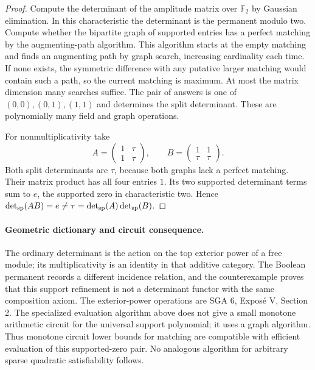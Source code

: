 \begin{proof}
Compute the determinant of the amplitude matrix over $\mathbb F_2$
by Gaussian elimination. In this characteristic the determinant
is the permanent modulo two. Compute whether the bipartite graph
of supported entries has a perfect matching by the augmenting-path
algorithm. This algorithm starts at the empty matching and finds
an augmenting path by graph search, increasing cardinality each
time. If none exists, the symmetric difference with any putative
larger matching would contain such a path, so the current matching
is maximum. At most the matrix dimension many searches suffice.
The pair of answers is one of $(0,0),(0,1),(1,1)$ and determines
the split determinant. These are polynomially many field and
graph operations.

For nonmultiplicativity take
\[
 A=\begin{pmatrix}1&\tau\\1&\tau\end{pmatrix},\qquad
 B=\begin{pmatrix}1&1\\\tau&\tau\end{pmatrix}.
\]
Both split determinants are $\tau$, because both graphs lack a
perfect matching. Their matrix product has all four entries $1$.
Its two supported determinant terms sum to $e$, the supported
zero in characteristic two. Hence
$\det_{\rm sp}(AB)=e\ne\tau=
\det_{\rm sp}(A)\det_{\rm sp}(B)$.
\end{proof}

\paragraph{Geometric dictionary and circuit consequence.}
The ordinary determinant is the action on the top exterior power
of a free module; its multiplicativity is an identity in that
additive category. The Boolean permanent records a different
incidence relation, and the counterexample proves that this
support refinement is not a determinant functor with the same
composition axiom. The exterior-power operations are SGA 6,
Expos\'e V, Section 2. The specialized evaluation algorithm above
does not give a small monotone arithmetic circuit for the
universal support polynomial; it uses a graph algorithm. Thus
monotone circuit lower bounds for matching are compatible with
efficient evaluation of this supported-zero pair. No analogous
algorithm for arbitrary sparse quadratic satisfiability follows.

